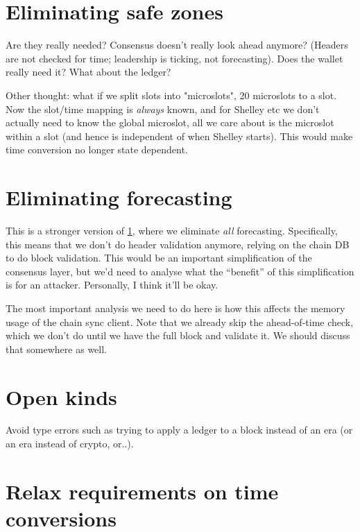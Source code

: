 \section{Eliminating safe zones}
\label{future:eliminating-safezones}

Are they really needed? Consensus doesn't really look ahead anymore?
(Headers are not checked for time; leadership is ticking, not forecasting).
Does the wallet really need it? What about the ledger?

Other thought: what if we split slots into "microslots", 20 microslots to a
slot. Now the slot/time mapping is \emph{always} known, and for Shelley etc
we don't actually need to know the global microslot, all we care about is
the microslot within a slot (and hence is independent of when Shelley starts).
This would make time conversion no longer state dependent.

\section{Eliminating forecasting}
\label{future:eliminating-forecasting}

This is a stronger version of \cref{future:eliminating-safezones}, where
we eliminate \emph{all} forecasting. Specifically, this means that we don't
do header validation anymore, relying on the chain DB to do block validation.
This would be an important simplification of the consensus layer, but we'd
need to analyse what the ``benefit'' of this simplification is for an
attacker. Personally, I think it'll be okay.

The most important analysis we need to do here is how this affects the memory
usage of the chain sync client. Note that we already skip the ahead-of-time
check, which we don't do until we have the full block and validate it. We
should discuss that somewhere as well.

\section{Open kinds}
\label{future:openkinds}

Avoid type errors such as trying to apply a ledger to a block instead of an era
(or an era instead of crypto, or..).

\section{Relax requirements on time conversions}
\label{future:relax-time-requirements}

